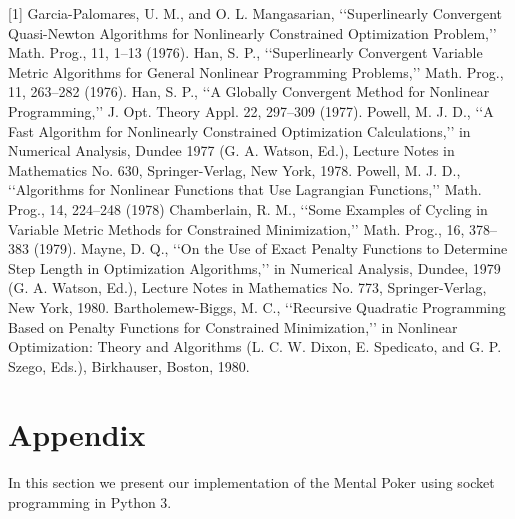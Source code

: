 \documentclass{article}
\begin{document}
[1] Garcia-Palomares, U. M., and O. L. Mangasarian, ‘‘Superlinearly Convergent
Quasi-Newton Algorithms for Nonlinearly Constrained Optimization Problem,’’
Math. Prog., 11, 1–13 (1976).
\newline\newline
[2] Han, S. P., ‘‘Superlinearly Convergent Variable Metric Algorithms for General Nonlinear Programming Problems,’’ Math. Prog., 11, 263–282 (1976).
\newline\newline
[3] Han, S. P., ‘‘A Globally Convergent Method for Nonlinear Programming,’’ J. Opt. Theory Appl. 22, 297–309 (1977).
\newline\newline
[4] Powell, M. J. D., ‘‘A Fast Algorithm for Nonlinearly Constrained Optimization Calculations,’’ in Numerical Analysis, Dundee 1977 (G. A. Watson, Ed.), Lecture Notes in Mathematics No. 630, Springer-Verlag, New York, 1978.
\newline\newline
[5] Powell, M. J. D., ‘‘Algorithms for Nonlinear Functions that Use Lagrangian Functions,’’ Math. Prog., 14, 224–248 (1978)
\newline\newline
[6] Chamberlain, R. M., ‘‘Some Examples of Cycling in Variable Metric Methods for Constrained Minimization,’’ Math. Prog., 16, 378–383 (1979).
\newline \newline
[7] Mayne, D. Q., ‘‘On the Use of Exact Penalty Functions to Determine Step Length in Optimization Algorithms,’’ in Numerical Analysis, Dundee, 1979 (G. A. Watson, Ed.), Lecture Notes in Mathematics No. 773, Springer-Verlag, New York, 1980.
\newline \newline
[8] Bartholemew-Biggs, M. C., ‘‘Recursive Quadratic Programming Based on Penalty Functions for Constrained Minimization,’’ in Nonlinear Optimization: Theory and Algorithms (L. C. W. Dixon, E. Spedicato, and G. P. Szego, Eds.), Birkhauser, Boston, 1980.

\section{Appendix}
In this section we present our implementation of the Mental Poker using socket programming in Python 3.

\end{document}
